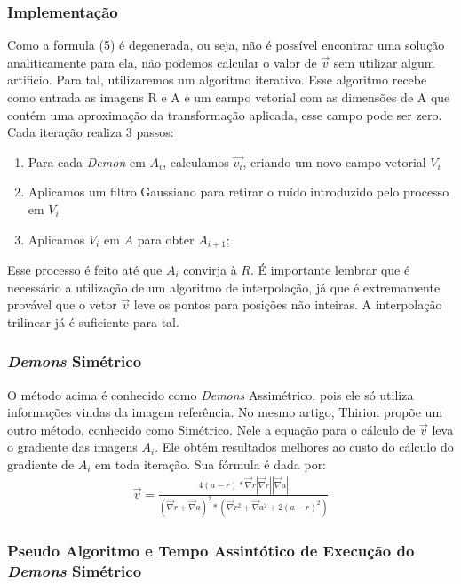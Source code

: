 \subsubsection{Implementação}
    Como a formula (5) é degenerada, ou seja, não é possível encontrar uma solução analiticamente para ela,
não podemos calcular o valor de $\vec{v}$ sem utilizar algum artificio. Para tal,
utilizaremos um algoritmo iterativo. Esse algoritmo recebe como entrada as imagens R e A e um campo vetorial
com as dimensões de A que contém uma aproximação da transformação aplicada, esse campo pode ser zero. 
Cada iteração realiza 3 passos:
\begin{enumerate}
    \item Para cada \textit{Demon} em $A_i$, calculamos $\vec{v_i}$, criando um novo campo vetorial $V_i$
    \item Aplicamos um filtro Gaussiano para retirar o ruído introduzido pelo processo em $V_i$
    \item Aplicamos $V_i$ em $A$ para obter $A_{i+1}$;
\end{enumerate}
    Esse processo é feito até que $A_i$ convirja à $R$. É importante lembrar que é necessário a
utilização de um algoritmo de interpolação, já que é extremamente provável que o vetor $\vec{v}$
leve os pontos para posições não inteiras. A interpolação trilinear já é suficiente para tal.

\subsubsection{\textit{Demons} Simétrico}
    O método acima é conhecido como \textit{Demons} Assimétrico, pois ele só utiliza informações vindas
da imagem referência. No mesmo artigo, Thirion propõe um outro método, conhecido como Simétrico.
Nele a equação para o cálculo de $\vec{v}$ leva o gradiente das imagens $A_i$. Ele obtém resultados
melhores ao custo do cálculo do gradiente de $A_i$ em toda iteração. Sua fórmula é dada por:
\begin{align}\label{math:demons}
    \vec{v} = \frac{4(a - r)*\vec{\nabla}r|\vec{\nabla}r||\vec{\nabla}a|}
                    {(\vec{\nabla}r+\vec{\nabla}a)^2*(\vec{\nabla}r^2 + \vec{\nabla}a^2 + 2(a - r)^2)}
\end{align}

\subsubsection{Pseudo Algoritmo e Tempo Assintótico de Execução do \textit{Demons} Simétrico}

